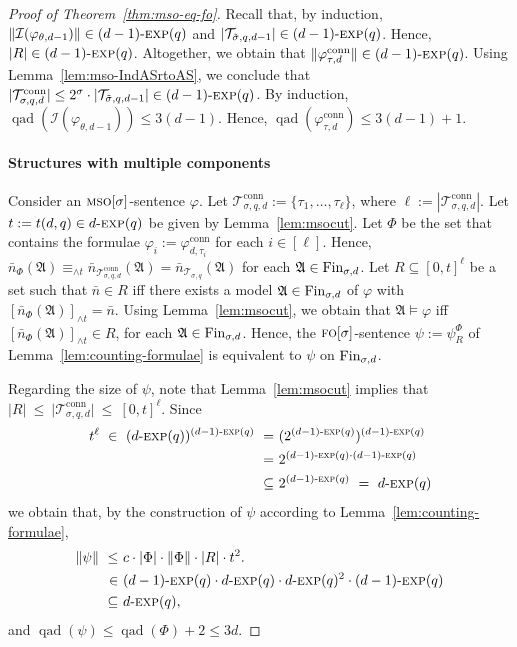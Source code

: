 \documentclass[11pt]{article}
\renewcommand{\phi}{\varphi}
\newcommand{\fin}{\textup{Fin}}
\newcommand{\conn}{\text{conn}}
\newcommand{\logic}[1]{\textsc{#1}}
\newcommand{\FO}{\logic{fo}}
\newcommand{\MSO}{\logic{mso}}
\newcommand{\types}[1][\sigma,q,d]{\mathcal{T}_{#1}}
\newcommand{\ctypes}[1][\sigma,q,d]{\mathcal{T}^{\conn}_{#1}}
\newcommand{\maxeq}[1]{\equiv_{{\wedge}#1}}
\newcommand{\redmax}[2]{[#1]_{{\wedge}#2}}
\newcommand{\size}[1]{\|#1\|}
\newcommand{\qad}[1]{\operatorname{qad}(#1)}
\newcommand{\absval}[1]{\vert #1 \vert}
\newcommand{\I}{\mathcal{I}}
\newcommand{\struct}[1]{\mathfrak{#1}}
\newcommand{\AS}{\struct{A}}
\newcommand{\set}[1]{\{#1\}}
\newcommand{\nexp}[1][d]{\ensuremath{#1\textnormal{-}\textsc{exp}}}
\begin{document}
\begin{proof}[Proof of Theorem~\ref{thm:mso-eq-fo}]
  Recall that, by induction, $\size{\I(\phi_{\theta,d-1})}\in \nexp[(d-1)](q)$
  and $\absval{\types[\tilde \sigma, q,d-1]}\in \nexp[(d-1)](q)$.  Hence,
  $\absval{R} \in \nexp[(d-1)](q)$.  Altogether, we obtain that
  $\size{\phi^{\conn}_{\tau,d}} \in \nexp[(d-1)](q)$.  Using
  Lemma~\ref{lem:mso-IndASrtoAS}, we conclude that
  $\absval{\ctypes[\sigma,q,d]}\leq 2^\sigma \cdot \absval{\types[\tilde
    \sigma,q,d-1]} \in \nexp[(d-1)](q)$. By induction, $\qad{\I(\phi_{\theta,d-1})}
  \leq 3(d-1)$. Hence, $\qad{\phi^{\conn}_{\tau,d}} \leq 3(d-1)+1$.

  \medskip

  \paragraph{Structures with multiple components}
  Consider an $\MSO[\sigma]$-sentence $\phi$.  Let
  $\ctypes:=\set{\tau_{1}, \ldots, \tau_{\ell}}$, where
  $\ell:=|\ctypes|$. Let $t:=t(d,q)\in \nexp[d](q)$ be given by
  Lemma~\ref{lem:msocut}.  Let $\Phi$ be the set that contains the
  formulae $\phi_{i}:=\phi^{\conn}_{d,\tau_{i}}$ for each
  $i\in[\ell]$. Hence, $\bar{n}_{\Phi}(\AS) \maxeq{t}
  \bar{n}_{\ctypes}(\AS)=\bar{n}_{\types[\sigma,q]}(\AS)$ for each $\AS\in \fin_{\sigma,d}$.  Let $R\subseteq
  [0,t]^{\ell}$ be a set such that $\bar{n}\in R$ iff there exists a
  model $\AS\in\fin_{\sigma,d}$ of $\phi$ with
  $\redmax{\bar{n}_{\Phi}(\AS)}{t}=\bar{n}$.  Using
  Lemma~\ref{lem:msocut}, we obtain that $\AS\models \phi$ iff
  $\redmax{\bar n_{\Phi}(\AS)}{t}\in R$, for each
  $\AS\in\fin_{\sigma,d}$. Hence, the $\FO[\sigma]$-sentence
  $\psi:=\psi^\Phi_R$ of Lemma~\ref{lem:counting-formulae} is
  equivalent to $\psi$ on $\fin_{\sigma,d}$.

  Regarding the size of $\psi$, note that Lemma~\ref{lem:msocut} implies that
  $\absval{R} \ \leq \ \absval{\ctypes} \ \leq \ [0,t]^{\ell}$.
  Since
  \begin{align*}
    t^\ell \ \in \ (\nexp[d](q))^{\nexp[(d-1)](q)} \ = \ &(2^{\nexp[(d-1)](q)})^{\nexp[(d-1)](q)}
    \\ = \ &2^{\nexp[(d-1)](q) \cdot \nexp[(d-1)](q)}\\
    \subseteq\ &2^{\nexp[(d-1)](q)} \ = \ \nexp[d](q)
  \end{align*}
  we obtain that, by the construction of $\psi$ according to Lemma~\ref{lem:counting-formulae},
  \begin{align*}
    \size{\psi} \ \leq \ &c \cdot \absval{\Phi} \cdot \size{\Phi} \cdot \absval{R} \cdot t^2.\\
    \in\ &\nexp[(d-1)](q) \cdot \nexp[d](q) \cdot \nexp[d](q)^2 \cdot \nexp[(d-1)](q)\\
    \subseteq\ &\nexp[d](q),
  \end{align*}
  and $\qad{\psi} \leq \qad{\Phi} + 2 \leq 3d$.
\end{proof}
\end{document}
